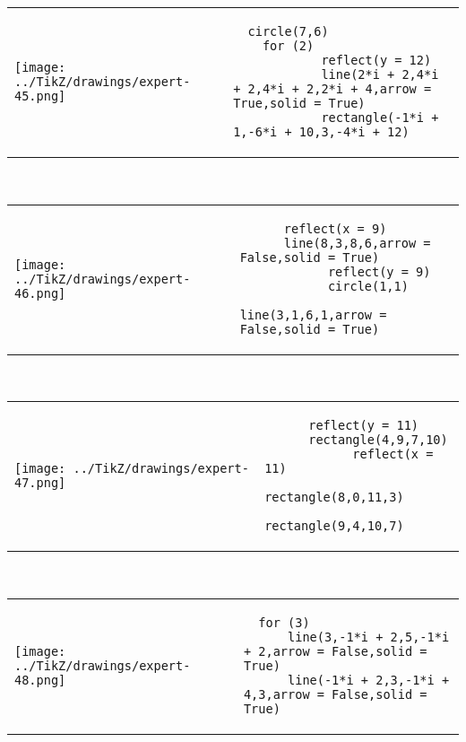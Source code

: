             \begin{tabular}{ll}
    \texttt{[image: ../TikZ/drawings/expert-45.png]}&
    
        \begin{minipage}{10cm}
        \begin{verbatim}
  circle(7,6)
    for (2)
            reflect(y = 12)
            line(2*i + 2,4*i + 2,4*i + 2,2*i + 4,arrow = True,solid = True)
            rectangle(-1*i + 1,-6*i + 10,3,-4*i + 12)
        \end{verbatim}
\end{minipage}

    \end{tabular}        
            \\

            \begin{tabular}{ll}
    \texttt{[image: ../TikZ/drawings/expert-46.png]}&
    
        \begin{minipage}{10cm}
        \begin{verbatim}
      reflect(x = 9)
      line(8,3,8,6,arrow = False,solid = True)
            reflect(y = 9)
            circle(1,1)
            line(3,1,6,1,arrow = False,solid = True)
        \end{verbatim}
\end{minipage}

    \end{tabular}        
            \\

            \begin{tabular}{ll}
    \texttt{[image: ../TikZ/drawings/expert-47.png]}&
    
        \begin{minipage}{10cm}
        \begin{verbatim}
      reflect(y = 11)
      rectangle(4,9,7,10)
            reflect(x = 11)
            rectangle(8,0,11,3)
            rectangle(9,4,10,7)
        \end{verbatim}
\end{minipage}

    \end{tabular}        
            \\

            \begin{tabular}{ll}
    \texttt{[image: ../TikZ/drawings/expert-48.png]}&
    
        \begin{minipage}{10cm}
        \begin{verbatim}
  for (3)
      line(3,-1*i + 2,5,-1*i + 2,arrow = False,solid = True)
      line(-1*i + 2,3,-1*i + 4,3,arrow = False,solid = True)
        \end{verbatim}
\end{minipage}

    \end{tabular}        
            \\

